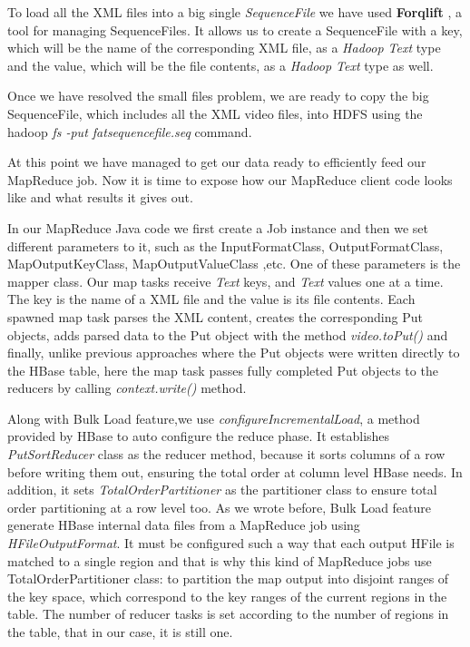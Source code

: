 To load all the XML files into a big single \textit{SequenceFile} we have used \textbf{Forqlift} \cite{Forqlift}, a tool for managing SequenceFiles. It allows us to create a SequenceFile with a key, which will be the name of the corresponding XML file, as a \textit{Hadoop Text} type and the value, which will be the file contents, as a \textit{Hadoop Text} type as well.

\bigskip

Once we have resolved the small files problem, we are ready to copy the big SequenceFile, which includes all the XML video files, into HDFS using the hadoop \textit{fs -put fatsequencefile.seq} command. 
\par
At this point we have managed to get our data ready to efficiently feed our MapReduce job. Now  it is time to expose how our MapReduce client code looks like and what results it gives out.

\bigskip



In our MapReduce Java code we first create a Job instance and then we set different parameters to it, such as the InputFormatClass, OutputFormatClass, MapOutputKeyClass, MapOutputValueClass ,etc. One of these parameters is the mapper class. Our map tasks receive \textit{Text} keys, and \textit{Text} values one at a time. The key is the name of a XML file and the value is its file contents. Each spawned map task parses the XML content, creates the corresponding Put objects, adds parsed data to the Put object with the method \textit{video.toPut()} and finally, unlike previous approaches where the Put objects were written directly to the HBase table, here the map task passes fully completed Put objects to the reducers by calling \textit{context.write()} method.
\par
Along with Bulk Load feature,we use \textit{configureIncrementalLoad}, a method provided by HBase to auto configure the reduce phase. It establishes \textit{PutSortReducer} class as the reducer method, because it sorts columns of a row before writing them out, ensuring the total order at column level HBase needs. In addition, it sets \textit{TotalOrderPartitioner} as the partitioner class to ensure total order partitioning at a row level too. As we wrote before, Bulk Load feature generate HBase internal data files from a MapReduce job using \textit{HFileOutputFormat}. It must be configured such a way that each output HFile is matched to a single region and that is why this kind of MapReduce jobs use TotalOrderPartitioner class: to partition the map output into disjoint ranges of the key space, which correspond to the key ranges of the current regions in the table. The number of reducer tasks is set according to the number of regions in the table, that in our case, it is still one.

